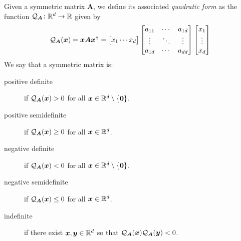 \begin{definition}
Given a symmetric matrix $\boldsymbol{A}$, we define its associated \emph{quadratic form} as the function $\mathcal{Q}_{\boldsymbol{A}}\colon \mathbb{R}^d \to \mathbb{R}$ given by
\begin{equation*}
\mathcal{Q}_{\boldsymbol{A}}(\boldsymbol{x}) = \boldsymbol{x} \boldsymbol{A} {\boldsymbol{x}}^\intercal = \begin{bmatrix} x_1 \dotsb x_d \end{bmatrix} \begin{bmatrix} a_{11} &\dotsb &a_{1d} \\ \vdots & \ddots & \vdots \\ a_{1d} &\dotsb &a_{dd} \end{bmatrix} \begin{bmatrix} x_1 \\ \vdots \\ x_d \end{bmatrix}
\end{equation*}
We say that a symmetric matrix is:
\begin{description}
\item[positive definite] if $\mathcal{Q}_{\boldsymbol{A}}(\boldsymbol{x}) > 0$ for all $\boldsymbol{x} \in \mathbb{R}^d \setminus \{ \boldsymbol{0} \}$.
\item[positive semidefinite] if $\mathcal{Q}_{\boldsymbol{A}}(\boldsymbol{x})\geq 0$ for all $\boldsymbol{x} \in \mathbb{R}^d$.
\item[negative definite] if $\mathcal{Q}_{\boldsymbol{A}}(\boldsymbol{x}) < 0$ for all $\boldsymbol{x} \in \mathbb{R}^d \setminus \{ \boldsymbol{0} \}$.
\item[negative semidefinite] if $\mathcal{Q}_{\boldsymbol{A}}(\boldsymbol{x}) \leq 0$ for all $\boldsymbol{x} \in \mathbb{R}^d$.
\item[indefinite] if there exist $\boldsymbol{x}, \boldsymbol{y} \in \mathbb{R}^d$ so that $\mathcal{Q}_{\boldsymbol{A}}(\boldsymbol{x}) \mathcal{Q}_{\boldsymbol{A}}(\boldsymbol{y}) < 0$. 
\end{description}
\end{definition}

